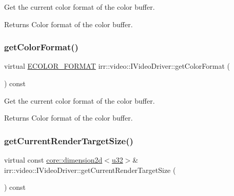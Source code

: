 Get the current color format of the color buffer. 

\begin{DoxyReturn}{Returns}
Color format of the color buffer. 
\end{DoxyReturn}
\mbox{\label{classirr_1_1video_1_1IVideoDriver_afc8f27bfd9756f4ca8de2d4bb37b0e15}} 
\subsubsection{\texorpdfstring{get\+Color\+Format()}{getColorFormat()}\hspace{0.1cm}{\footnotesize\ttfamily [2/2]}}
{\footnotesize\ttfamily virtual \hyperlink{namespaceirr_1_1video_a1d5e487888c32b1674a8f75116d829ed}{E\+C\+O\+L\+O\+R\+\_\+\+F\+O\+R\+M\+AT} irr\+::video\+::\+I\+Video\+Driver\+::get\+Color\+Format (\begin{DoxyParamCaption}{ }\end{DoxyParamCaption}) const\hspace{0.3cm}{\ttfamily [pure virtual]}}



Get the current color format of the color buffer. 

\begin{DoxyReturn}{Returns}
Color format of the color buffer. 
\end{DoxyReturn}
\mbox{\label{classirr_1_1video_1_1IVideoDriver_a76fc2aba131b5986d07d92c6888cfc0c}} 
\subsubsection{\texorpdfstring{get\+Current\+Render\+Target\+Size()}{getCurrentRenderTargetSize()}\hspace{0.1cm}{\footnotesize\ttfamily [1/2]}}
{\footnotesize\ttfamily virtual const \hyperlink{classirr_1_1core_1_1dimension2d}{core\+::dimension2d}$<$\hyperlink{namespaceirr_a0416a53257075833e7002efd0a18e804}{u32}$>$\& irr\+::video\+::\+I\+Video\+Driver\+::get\+Current\+Render\+Target\+Size (\begin{DoxyParamCaption}{ }\end{DoxyParamCaption}) const\hspace{0.3cm}{\ttfamily [pure virtual]}}



